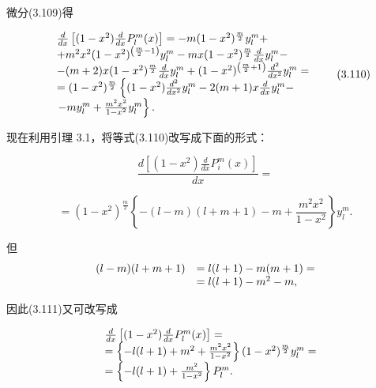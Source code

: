微分(3.109)得

\begin{equation*}
\begin{array}{r l} & \frac {d}{d x} \left[ (1 - x ^ {2}) \frac {d}{d x} P _ {l} ^ {m} (x) \right] = - m (1 - x ^ {2}) ^ {\frac {m}{2}} y _ {l} ^ {m} + \\ & + m ^ {2} x ^ {2} (1 - x ^ {2}) ^ {\left(\frac {m}{2} - 1\right)} y _ {l} ^ {m} - m x (1 - x ^ {2}) ^ {\frac {m}{2}} \frac {d}{d x} y _ {l} ^ {m} - \\ & - (m + 2) x (1 - x ^ {2}) ^ {\frac {m}{2}} \frac {d}{d x} y _ {l} ^ {m} + (1 - x ^ {2}) ^ {\left(\frac {m}{2} + 1\right)} \frac {d ^ {2}}{d x ^ {2}} y _ {l} ^ {m} = \\ & = (1 - x ^ {2}) ^ {\frac {m}{2}} \left\{(1 - x ^ {2}) \frac {d ^ {2}}{d x ^ {2}} y _ {l} ^ {m} - 2 (m + 1) x \frac {d}{d x} y _ {l} ^ {m} - \right. \\ & \left. - m y _ {l} ^ {m} + \frac {m ^ {2} x ^ {2}}{1 - x ^ {2}} y _ {l} ^ {m} \right\}. \end{array} \tag{3.110}
\end{equation*}

现在利用引理 3.1，将等式(3.110)改写成下面的形式：

\begin{equation*}
\frac {d \left[ (1 - x ^ {2}) \frac {d}{d x} P _ {i} ^ {m} (x) \right]}{d x} =
\end{equation*}

\begin{equation*}
= (1 - x ^ {2}) ^ {\frac {m}{2}} \left\{- (l - m) (l + m + 1) - m + \frac {m ^ {2} x ^ {2}}{1 - x ^ {2}} \right\} y _ {l} ^ {m}.\tag{3.111}
\end{equation*}

但
\begin{equation*}
\begin{array}{r l} (l - m) (l + m + 1) & = l (l + 1) - m (m + 1) = \\ & = l (l + 1) - m ^ {2} - m, \end{array}
\end{equation*}

因此(3.111)又可改写成

\begin{equation*}
\begin{array}{r l} & \frac {d}{d x} \left[ (1 - x ^ {2}) \frac {d}{d x} P _ {l} ^ {m} (x) \right] = \\ & = \left\{- l (l + 1) + m ^ {2} + \frac {m ^ {2} x ^ {2}}{1 - x ^ {2}} \right\} (1 - x ^ {2}) ^ {\frac {m}{2}} y _ {l} ^ {m} = \\ & = \left\{- l (l + 1) + \frac {m ^ {2}}{1 - x ^ {2}} \right\} P _ {l} ^ {m}. \end{array}
\end{equation*}

